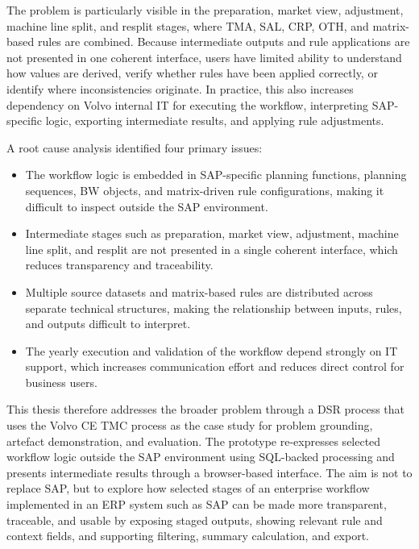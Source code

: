The problem is particularly visible in the preparation, market view, adjustment, machine line split, and resplit stages, where TMA, SAL, CRP, OTH, and matrix-based rules are combined. Because intermediate outputs and rule applications are not presented in one coherent interface, users have limited ability to understand how values are derived, verify whether rules have been applied correctly, or identify where inconsistencies originate. In practice, this also increases dependency on Volvo internal IT for executing the workflow, interpreting SAP-specific logic, exporting intermediate results, and applying rule adjustments.

A root cause analysis identified four primary issues:
\begin{itemize}
    \item The workflow logic is embedded in SAP-specific planning functions, planning sequences, BW objects, and matrix-driven rule configurations, making it difficult to inspect outside the SAP environment.
    \item Intermediate stages such as preparation, market view, adjustment, machine line split, and resplit are not presented in a single coherent interface, which reduces transparency and traceability.
    \item Multiple source datasets and matrix-based rules are distributed across separate technical structures, making the relationship between inputs, rules, and outputs difficult to interpret.
    \item The yearly execution and validation of the workflow depend strongly on IT support, which increases communication effort and reduces direct control for business users.
\end{itemize}

This thesis therefore addresses the broader problem through a DSR process that uses the Volvo CE TMC process as the case study for problem grounding, artefact demonstration, and evaluation. The prototype re-expresses selected workflow logic outside the SAP environment using SQL-backed processing and presents intermediate results through a browser-based interface. The aim is not to replace SAP, but to explore how selected stages of an enterprise workflow implemented in an ERP system such as SAP can be made more transparent, traceable, and usable by exposing staged outputs, showing relevant rule and context fields, and supporting filtering, summary calculation, and export.












